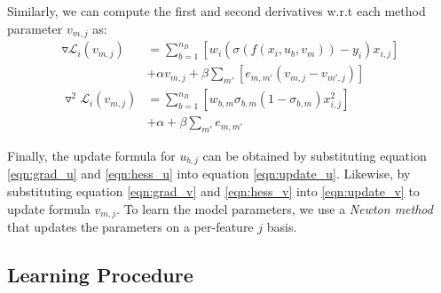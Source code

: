 Similarly, we can compute the first and second derivatives w.r.t each method parameter $v_{m,j}$ as:
\begin{align}
\label{eqn:grad_v}
\triangledown \mathcal{L}_i(v_{m,j}) &= \sum_{b=1}^{n_{B}} \left[ w_{i} (\sigma(f(x_i, u_b, v_m)) - y_{i}) x_{i,j} \right] \nonumber \\
& + \alpha v_{m,j} + \beta \sum_{m'} \left[ e_{m,m'} \left( v_{m,j} - v_{m',j} \right) \right] \\
\label{eqn:hess_v}
\triangledown^2 \mathcal{L}_i(v_{m,j}) &= \sum_{b=1}^{n_{B}} \left[ w_{b,m} \sigma_{b,m} ( 1 - \sigma_{b,m}) x_{i,j}^2 \right] \nonumber \\
& + \alpha + \beta \sum_{m'} e_{m,m'}
\end{align}

Finally, the update formula for $u_{b,j}$ can be obtained by substituting equation \ref{eqn:grad_u} and \ref{eqn:hess_u} into equation \ref{eqn:update_u}. Likewise, by substituting equation \ref{eqn:grad_v} and \ref{eqn:hess_v} into \ref{eqn:update_v} to update formula $v_{m,j}$. To learn the model parameters, we use a \emph{Newton method} that updates the parameters on a per-feature $j$ basis.

\subsection{Learning Procedure}
\label{sec:learning}

